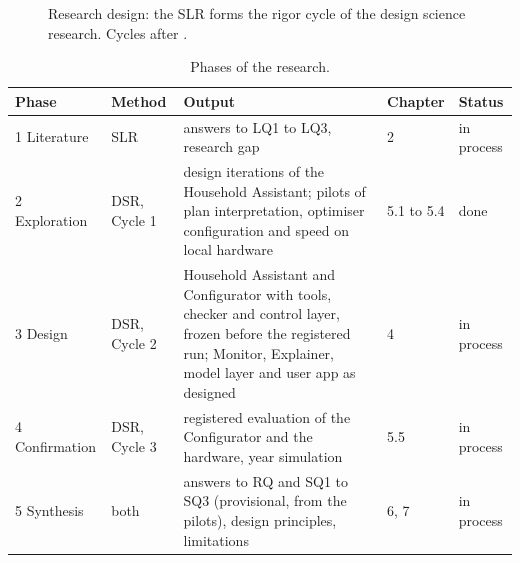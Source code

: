 \begin{figure}[htbp]
\centering
{}
\caption{Research design: the SLR forms the rigor cycle of the design
science research. Cycles after \textcite{hevner2007}.}
\label{fig:method}
\end{figure}

\begin{table}[htbp]
\caption{Phases of the research.}
\label{tab:phases}
\small
\begin{tabularx}{\textwidth}{@{}p{2.6cm}p{2.4cm}Xp{1.6cm}p{1.6cm}@{}}
\toprule
Phase & Method & Output & Chapter & Status \\
\midrule
1 Literature & SLR & answers to LQ1 to LQ3, research gap & 2 & in process \\
2 Exploration & DSR, Cycle 1 & design iterations of the Household Assistant; pilots of plan interpretation, optimiser configuration and speed on local hardware & 5.1 to 5.4 & done \\
3 Design & DSR, Cycle 2 & Household Assistant and Configurator with tools, checker and control layer, frozen before the registered run; Monitor, Explainer, model layer and user app as designed & 4 & in process \\
4 Confirmation & DSR, Cycle 3 & registered evaluation of the Configurator and the hardware, year simulation & 5.5 & in process \\
5 Synthesis & both & answers to RQ and SQ1 to SQ3 (provisional, from the pilots), design principles, limitations & 6, 7 & in process \\
\bottomrule
\end{tabularx}
\end{table}

